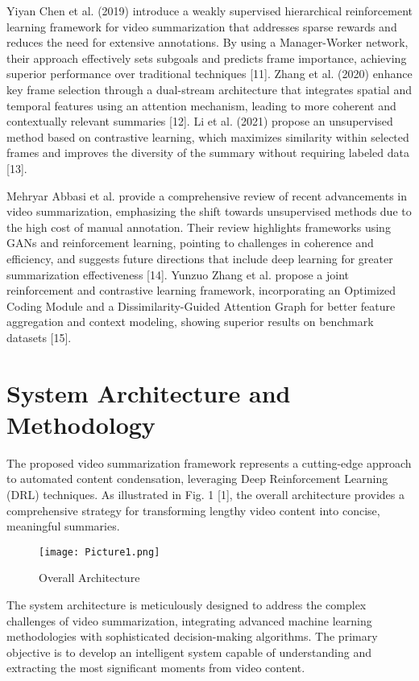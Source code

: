 \documentclass[conference]{IEEEtran}
\begin{document}
Yiyan Chen et al. (2019) introduce a weakly supervised hierarchical reinforcement learning framework for video summarization that addresses sparse rewards and reduces the need for extensive annotations. By using a Manager-Worker network, their approach effectively sets subgoals and predicts frame importance, achieving superior performance over traditional techniques [11]. Zhang et al. (2020) enhance key frame selection through a dual-stream architecture that integrates spatial and temporal features using an attention mechanism, leading to more coherent and contextually relevant summaries [12]. Li et al. (2021) propose an unsupervised method based on contrastive learning, which maximizes similarity within selected frames and improves the diversity of the summary without requiring labeled data [13].

Mehryar Abbasi et al. provide a comprehensive review of recent advancements in video summarization, emphasizing the shift towards unsupervised methods due to the high cost of manual annotation. Their review highlights frameworks using GANs and reinforcement learning, pointing to challenges in coherence and efficiency, and suggests future directions that include deep learning for greater summarization effectiveness [14]. Yunzuo Zhang et al. propose a joint reinforcement and contrastive learning framework, incorporating an Optimized Coding Module and a Dissimilarity-Guided Attention Graph for better feature aggregation and context modeling, showing superior results on benchmark datasets [15].

\section{System Architecture and Methodology}
The proposed video summarization framework represents a cutting-edge approach to automated content condensation, leveraging Deep Reinforcement Learning (DRL) techniques. As illustrated in Fig. 1 [1], the overall architecture provides a comprehensive strategy for transforming lengthy video content into concise, meaningful summaries.

\begin{figure}[htbp]
\centerline{\texttt{[image: Picture1.png]}}
\caption{Overall Architecture}
\label{fig}
\end{figure}

The system architecture is meticulously designed to address the complex challenges of video summarization, integrating advanced machine learning methodologies with sophisticated decision-making algorithms. The primary objective is to develop an intelligent system capable of understanding and extracting the most significant moments from video content.
\end{document}
